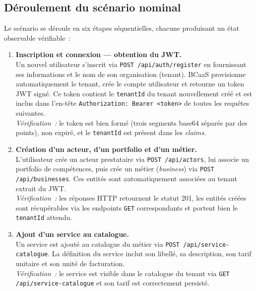 \subsection{Déroulement du scénario nominal}
\label{subsec:e2e-scenario}

Le scénario se déroule en six étapes séquentielles, chacune produisant un état observable
vérifiable~:

\begin{enumerate}[leftmargin=*, label=\textbf{Étape \arabic*.}]

  \item \textbf{Inscription et connexion — obtention du JWT.}\\
    Un nouvel utilisateur s'inscrit via \texttt{POST /api/auth/register} en fournissant
    ses informations et le nom de son organisation (tenant). BCaaS provisionne
    automatiquement le tenant, crée le compte utilisateur et retourne un token JWT signé.
    Ce token contient le \texttt{tenantId} du tenant nouvellement créé et est inclus dans
    l'en-tête \texttt{Authorization: Bearer <token>} de toutes les requêtes suivantes.\\
    \textit{Vérification~:} le token est bien formé (trois segments base64 séparés par des
    points), non expiré, et le \texttt{tenantId} est présent dans les \textit{claims}.

  \item \textbf{Création d'un acteur, d'un portfolio et d'un métier.}\\
    L'utilisateur crée un acteur prestataire via \texttt{POST /api/actors}, lui associe
    un portfolio de compétences, puis crée un métier (\textit{business}) via
    \texttt{POST /api/businesses}. Ces entités sont automatiquement associées au tenant
    extrait du JWT.\\
    \textit{Vérification~:} les réponses HTTP retournent le statut 201, les entités
    créées sont récupérables via les endpoints \texttt{GET} correspondants et portent bien
    le \texttt{tenantId} attendu.

  \item \textbf{Ajout d'un service au catalogue.}\\
    Un service est ajouté au catalogue du métier via
    \texttt{POST /api/service-catalogue}. La définition du service inclut
    son libellé, sa description, son tarif unitaire et son unité de facturation.\\
    \textit{Vérification~:} le service est visible dans le catalogue du tenant via
    \texttt{GET /api/service-catalogue} et son tarif est correctement persisté.


\end{enumerate}
